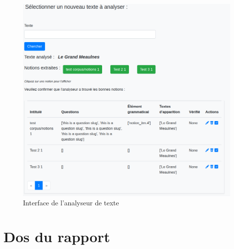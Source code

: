 \documentclass[12pt]{article}
\begin{document}
\begin{figure}
    \centering
    \includegraphics[scale=0.5]{analyseur_interface.png}
    \caption{Interface de l'analyseur de texte}
    \label{fig:analyseur}
\end{figure}

\clearpage
\section*{Dos du rapport}
\thispagestyle{empty}

\end{document}
